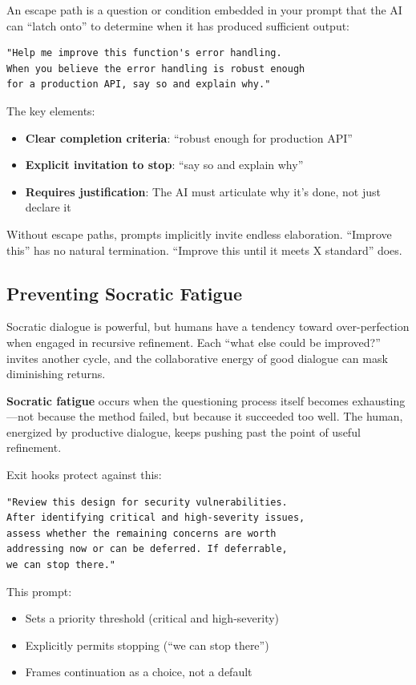 An escape path is a question or condition embedded in your prompt that the AI can ``latch onto'' to determine when it has produced sufficient output:

\begin{lstlisting}
"Help me improve this function's error handling.
When you believe the error handling is robust enough
for a production API, say so and explain why."
\end{lstlisting}

The key elements:
\begin{itemize}
    \item \textbf{Clear completion criteria}: ``robust enough for production API''
    \item \textbf{Explicit invitation to stop}: ``say so and explain why''
    \item \textbf{Requires justification}: The AI must articulate why it's done, not just declare it
\end{itemize}

Without escape paths, prompts implicitly invite endless elaboration. ``Improve this'' has no natural termination. ``Improve this until it meets X standard'' does.

\subsection{Preventing Socratic Fatigue}

Socratic dialogue is powerful, but humans have a tendency toward over-perfection when engaged in recursive refinement. Each ``what else could be improved?'' invites another cycle, and the collaborative energy of good dialogue can mask diminishing returns.

\textbf{Socratic fatigue} occurs when the questioning process itself becomes exhausting---not because the method failed, but because it succeeded too well. The human, energized by productive dialogue, keeps pushing past the point of useful refinement.

Exit hooks protect against this:

\begin{lstlisting}
"Review this design for security vulnerabilities.
After identifying critical and high-severity issues,
assess whether the remaining concerns are worth
addressing now or can be deferred. If deferrable,
we can stop there."
\end{lstlisting}

This prompt:
\begin{itemize}
    \item Sets a priority threshold (critical and high-severity)
    \item Explicitly permits stopping (``we can stop there'')
    \item Frames continuation as a choice, not a default
\end{itemize}

